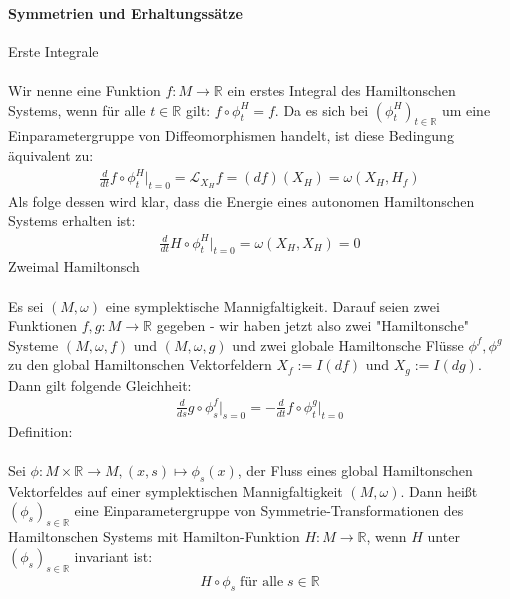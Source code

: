 \documentclass[10pt,a4paper]{article}
\begin{document}
\paragraph{Symmetrien und Erhaltungssätze} $\,$ \\
Erste Integrale\\
\\
Wir nenne eine Funktion $ f: M \longrightarrow \mathbb{R} $ ein erstes Integral des Hamiltonschen Systems, wenn für alle $ t \in \mathbb{R}$ gilt: $ f \circ \phi_t^H =f$. Da es sich bei $ (\phi_t^H)_{t \in \mathbb{R}} $ um eine Einparametergruppe von Diffeomorphismen handelt, ist diese Bedingung äquivalent zu:
\begin{align}
\frac{d}{dt} f \circ \phi_t^H \vert_{t=0} = \mathcal{L}_{X_H}f=(df)(X_H)=\omega (X_H,H_f)
\end{align}
Als folge dessen wird klar, dass die Energie eines autonomen Hamiltonschen Systems erhalten ist:
\begin{align}
\frac{d}{dt} H \circ \phi_t^H \vert_{t=0} =\omega (X_H,X_H) =0
\end{align}
Zweimal Hamiltonsch\\
\\
Es sei $(M, \omega)$ eine symplektische Mannigfaltigkeit. Darauf seien zwei Funktionen $f,g: M \longrightarrow \mathbb{R} $ gegeben - wir haben jetzt also zwei "Hamiltonsche" Systeme $ (M, \omega, f) $ und $ (M, \omega , g) $ und zwei globale Hamiltonsche Flüsse $ \phi^f , \phi^g $ zu den global Hamiltonschen Vektorfeldern $ X_f := I(df) $ und $ X_g := I(dg) $. Dann gilt folgende Gleichheit:
\begin{align}
\frac{d}{ds} g \circ \phi_s^f \vert_{s=0} = -\frac{d}{dt} f \circ \phi_t^g \vert_{t=0} 
\end{align}
Definition: \\
\\
Sei $ \phi : M \times \mathbb{R} \longrightarrow M, (x,s) \longmapsto \phi_s (x) $, der Fluss eines global Hamiltonschen Vektorfeldes auf einer symplektischen Mannigfaltigkeit $(M, \omega)$. Dann heißt $ (\phi_s)_{s \in \mathbb{R}} $ eine Einparametergruppe von Symmetrie-Transformationen des Hamiltonschen Systems mit Hamilton-Funktion $ H: M \longrightarrow \mathbb{R}$, wenn $H$ unter $ (\phi_s)_{ s \in \mathbb{R}} $ invariant ist:
\begin{align}
H \circ \phi_s \; \text{für alle} \; s \in \mathbb{R}
\end{align}
\end{document}

